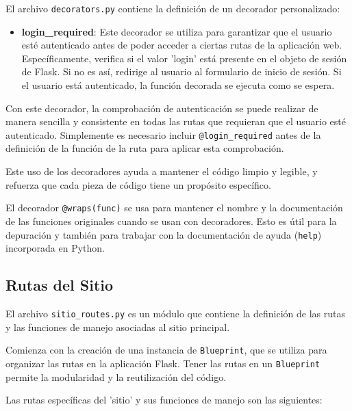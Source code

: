 \documentclass[a4paper, 12pt]{book}
\begin{document}
El archivo \texttt{decorators.py} contiene la definición de un decorador personalizado:

\begin{itemize}
    \item \textbf{login\_required}: Este decorador se utiliza para garantizar que el usuario esté autenticado antes de poder acceder a ciertas rutas de la aplicación web. 
    Específicamente, verifica si el valor 'login' está presente en el objeto de sesión de Flask. Si no es así, redirige al usuario al formulario de inicio de sesión. 
    Si el usuario está autenticado, la función decorada se ejecuta como se espera.
\end{itemize}

Con este decorador, la comprobación de autenticación se puede realizar de manera sencilla y consistente en todas las rutas que requieran que el usuario esté autenticado. 
Simplemente es necesario incluir \texttt{@login\_required} antes de la definición de la función de la ruta para aplicar esta comprobación.

Este uso de los decoradores ayuda a mantener el código limpio y legible, y refuerza que cada pieza de código tiene un propósito específico.

El decorador \texttt{@wraps(func)} se usa para mantener el nombre y la documentación de las funciones originales cuando se usan con decoradores. Esto es útil para la 
depuración y también para trabajar con la documentación de ayuda (\texttt{help}) incorporada en Python.


\subsection{Rutas del Sitio}
\label{sec:rutas_sitio}

El archivo \texttt{sitio\_routes.py} es un módulo que contiene la definición de las rutas y las funciones de manejo asociadas al sitio principal.
 
Comienza con la creación de una instancia de \texttt{Blueprint}, que se utiliza para organizar las rutas en la aplicación Flask. Tener las rutas en un \texttt{Blueprint} permite la modularidad y la reutilización del código.

Las rutas específicas del 'sitio' y sus funciones de manejo son las siguientes:
\end{document}
